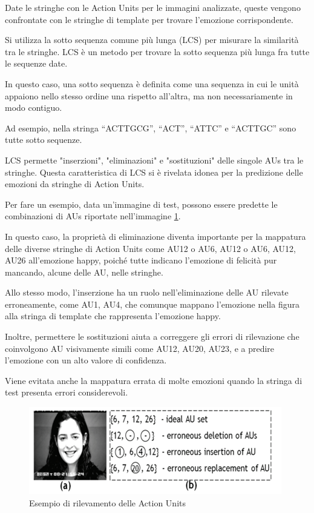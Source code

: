 Date le stringhe con le Action Units per le immagini analizzate, queste vengono confrontate con le stringhe di template per trovare l'emozione corrispondente. 

Si utilizza la sotto sequenza comune più lunga (LCS) \cite{IntroToAlgo} per misurare la similarità tra le stringhe. LCS è un metodo per trovare la sotto sequenza più lunga fra tutte le sequenze date. 

In questo caso, una sotto sequenza è definita come una sequenza in cui le unità appaiono nello stesso ordine una rispetto all’altra, ma non necessariamente in modo contiguo. 

Ad esempio, nella stringa “ACTTGCG”, “ACT”, “ATTC” e “ACTTGC” sono tutte sotto sequenze. 

LCS permette "inserzioni", "eliminazioni" e "sostituzioni" delle singole AUs tra le stringhe. Questa caratteristica di LCS si è rivelata idonea per la predizione delle emozioni da stringhe di Action Units.

Per fare un esempio, data un'immagine di test, possono essere predette le combinazioni di AUs riportate nell’immagine \ref{fig:image6}.

In questo caso, la proprietà di eliminazione diventa importante per la mappatura delle diverse stringhe di Action Units come {AU12} o {AU6, AU12} o {AU6, AU12, AU26} all'emozione happy, poiché tutte indicano l’emozione di felicità pur mancando, alcune delle AU, nelle stringhe. 

Allo stesso modo, l'inserzione ha un ruolo nell’eliminazione delle AU rilevate erroneamente, come {AU1, AU4}, che comunque mappano l'emozione nella figura alla stringa di template che rappresenta l’emozione happy. 

Inoltre, permettere le sostituzioni aiuta a correggere gli errori di rilevazione che coinvolgono AU visivamente simili come AU12, AU20, AU23, e a predire l'emozione con un alto valore di confidenza. 

Viene evitata anche la mappatura errata di molte emozioni quando la stringa di test presenta errori considerevoli.
\begin{figure}
    \begin{center}    
        \includegraphics[width=1\linewidth]{images/21.png}
        \caption{Esempio di rilevamento delle Action Units}
        \label{fig:image6}
    \end{center}
\end{figure}

